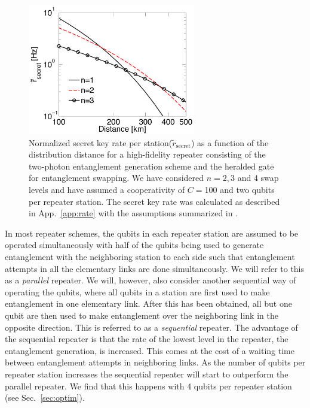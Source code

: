 \begin{figure} 
\centering
\includegraphics[width=0.65\textwidth]{./figs_Borregaard_PRA2015/figureX4}
\caption[Number of swap levels]{Normalized secret key rate per
station($\tilde{r}_{\text{secret}}$) as a function of the distribution distance
for a high-fidelity repeater consisting of the two-photon entanglement
generation scheme and the heralded gate for entanglement swapping.  We have
considered $n=2,3$ and 4 swap levels and have assumed a cooperativity of $C=$100
and two qubits per repeater station. The secret key rate was calculated as
described in App.~\ref{app:rate} with the assumptions summarized in
.  }
\label{fig:figureX4}
\end{figure} 
  
In most repeater schemes, the qubits in each repeater station are assumed to be
operated simultaneously with half of the qubits being used to generate
entanglement with the neighboring station to each side such that entanglement
attempts in all the elementary links are done simultaneously. We will refer to
this as a \emph{parallel} repeater.  We will, however, also consider another
sequential way of operating the qubits, where all qubits in a station are first
used to make entanglement in one elementary link. After this has been obtained,
all but one qubit are then used to make entanglement over the neighboring link
in the opposite direction. This is referred to as a \emph{sequential} repeater.
The advantage of the sequential repeater is that the rate of the lowest level in
the repeater, the entanglement generation, is increased. This comes at the cost
of a waiting time between entanglement attempts in neighboring links. As the
number of qubits per repeater station increases the sequential repeater will
start to outperform the parallel repeater. We find that this happens with 4
qubits per repeater station (see Sec.~\ref{sec:optim}).

